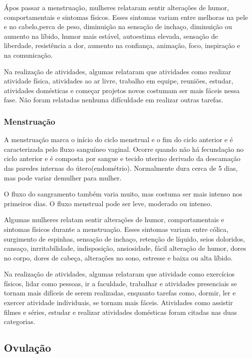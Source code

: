 Ápos passar a menstruação, mulheres relataram sentir alterações de humor, comportamentais e sintomas físicos. Esses sintomas variam entre melhoras na pele e no cabelo,perca de peso, diminuição na sensação de inchaço, diminuição ou aumento na líbido, humor mais estável, autoestima elevada, sensação de liberdade, resistência a dor,  aumento na confiança, animação, foco, inspiração e na comunicação.

Na realização de atividades, algumas relataram que atividades como realizar atividade física, atividades ao ar livre, trabalho em equipe, reuniões, estudar, atividades domésticas e começar projetos novos costumam ser mais fáceis nessa fase. Não foram relatadas nenhuma difículdade em realizar outras tarefas.

\subsubsection{Menstruação}

A menstruação marca o início do ciclo menstrual e o fim do ciclo anterior e é caracterizada pelo fluxo sanguíneo vaginal. Ocorre quando não há fecundação no ciclo anterior e é composta por sangue e tecido uterino derivado da descamação das paredes internas do útero(endométrio). Normalmente dura cerca de 5 dias, mas pode variar demulher para mulher.

O fluxo do sangramento também varia muito, mas costuma ser mais intenso nos primeiros dias. O fluxo menstrual pode ser leve, moderado ou intenso.

Algumas mulheres relatam sentir alterações de humor, comportamentais e sintomas físicos durante a menstruação. Esses sintomas variam entre cólica, surgimento de espinhas, sensação de inchaço, retenção de líquido, seios doloridos, cansaço, inrritabilidade, indisposição, ansiosidade, fácil alteração de humor, dores no corpo, dores de cabeça, alterações no sono, estresse e baixa ou alta líbido.

Na realização de atividades, algumas relataram que atividade como exercícios físicos, lidar como pessoas, ir a faculdade, trabalhar e atividades presenciais se tornam mais difíceis de serem realizadas, enquanto tarefas como, dormir, ler e exercer atividade individuais, se tornam mais fáceis. Atividades como assistir filmes e séries, estudar e realizar atividades domésticas foram citadas nas duas categorias.

\subsection{Ovulação}

